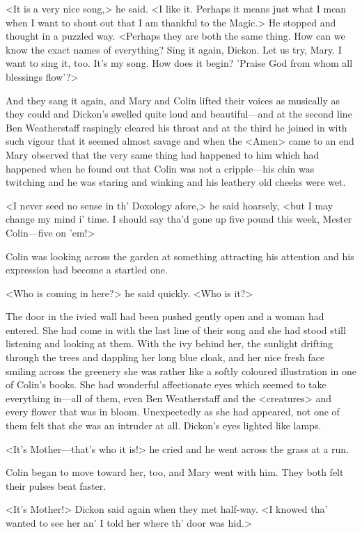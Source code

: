 <It is a very nice song,> he said. <I like it. Perhaps it means just what I mean when I want to shout out that I am thankful to the Magic.> He stopped and thought in a puzzled way. <Perhaps they are both the same thing. How can we know the exact names of everything? Sing it again, Dickon. Let us try, Mary. I want to sing it, too. It's my song. How does it begin? 'Praise God from whom all blessings flow'?>

And they sang it again, and Mary and Colin lifted their voices as musically as they could and Dickon's swelled quite loud and beautiful—and at the second line Ben Weatherstaff raspingly cleared his throat and at the third he joined in with such vigour that it seemed almost savage and when the <Amen> came to an end Mary observed that the very same thing had happened to him which had happened when he found out that Colin was not a cripple—his chin was twitching and he was staring and winking and his leathery old cheeks were wet.

<I never seed no sense in th' Doxology afore,> he said hoarsely, <but I may change my mind i' time. I should say tha'd gone up five pound this week, Mester Colin—five on 'em!>

Colin was looking across the garden at something attracting his attention and his expression had become a startled one.

<Who is coming in here?> he said quickly. <Who is it?>

The door in the ivied wall had been pushed gently open and a woman had entered. She had come in with the last line of their song and she had stood still listening and looking at them. With the ivy behind her, the sunlight drifting through the trees and dappling her long blue cloak, and her nice fresh face smiling across the greenery she was rather like a softly coloured illustration in one of Colin's books. She had wonderful affectionate eyes which seemed to take everything in—all of them, even Ben Weatherstaff and the <creatures> and every flower that was in bloom. Unexpectedly as she had appeared, not one of them felt that she was an intruder at all. Dickon's eyes lighted like lamps.

<It's Mother—that's who it is!> he cried and he went across the grass at a run.

Colin began to move toward her, too, and Mary went with him. They both felt their pulses beat faster.

<It's Mother!> Dickon said again when they met half-way. <I knowed tha' wanted to see her an' I told her where th' door was hid.>

